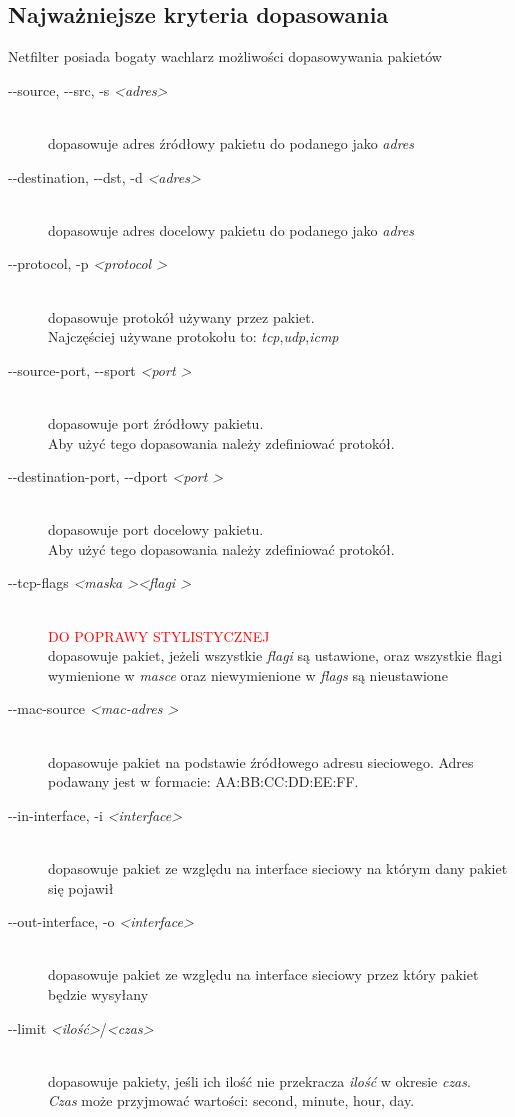 \documentclass[a4paper,12pt,oneside]{book}
\newcommand{\param}[1]{\textit{\textless #1\textgreater}}
\begin{document}
		\subsection{Najważniejsze kryteria dopasowania}
			Netfilter posiada bogaty wachlarz możliwości dopasowywania pakietów
			\begin{description}
				\item[-{}-source, -{}-src, -s \param{adres} ] \hfill \\
					dopasowuje adres źródłowy pakietu do podanego jako \textit{adres}
				\item[-{}-destination, -{}-dst, -d \param{adres}] \hfill\\
					dopasowuje adres docelowy pakietu do podanego jako \textit{adres}
				\item[-{}-protocol, -p \textit{\textless protocol \textgreater}] \hfill \\
					dopasowuje protokół używany przez pakiet.\\
					Najczęściej używane protokołu to: \textit{tcp},\textit{udp},\textit{icmp}
				\item[-{}-source-port, -{}-sport \textit{\textless port \textgreater} ]\hfill\\
					dopasowuje port źródłowy pakietu.\\
					Aby użyć tego dopasowania należy zdefiniować protokół.
				\item[-{}-destination-port, -{}-dport \textit{\textless port \textgreater}] \hfill \\
					dopasowuje port docelowy pakietu.\\
					Aby użyć tego dopasowania należy zdefiniować protokół.
				\item[-{}-tcp-flags \textit{\textless maska \textgreater \textless flagi \textgreater}] \hfill \\
					\textcolor{red}{\Large{DO POPRAWY STYLISTYCZNEJ}}\\
					dopasowuje pakiet, jeżeli wszystkie \textit{flagi} są ustawione, oraz wszystkie flagi wymienione w \textit{masce} oraz niewymienione w \textit{flags} są nieustawione
				\item[-{}-mac-source \textit{\textless mac-adres \textgreater}] \hfill \\
					dopasowuje pakiet na podstawie źródłowego adresu sieciowego. Adres podawany jest w formacie: AA:BB:CC:DD:EE:FF.
				\item[-{}-in-interface, -i \param{interface}] \hfill \\
					dopasowuje pakiet ze względu na interface sieciowy na którym dany pakiet się pojawił	
				\item[-{}-out-interface, -o \param{interface}] \hfill \\
					dopasowuje pakiet ze względu na interface sieciowy przez który pakiet będzie wysyłany
				\item[-{}-limit \param{ilość}/\param{czas}] \hfill \\
					dopasowuje pakiety, jeśli ich ilość nie przekracza \textit{ilość} w okresie \textit{czas}.\\
					\textit{Czas} może przyjmować wartości: second, minute, hour, day.
			\end{description}
\end{document}
